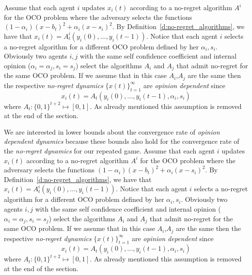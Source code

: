 Assume that each agent $i$ updates $x_i(t)$ according to a no-regret algorithm $A^i$
for the OCO problem where the adversary selects the functions
$(1-\alpha_i)(x-b_t)^2 + \alpha_i(x-s_i)^2$. By Definition~\ref{d:no-regret_algorithms},
we have that $x_i(t)= A^i_t(y_i(0),\ldots,y_i(t-1))$. Notice that
each agent $i$ selects a no-regret algorithm for a different OCO
problem defined by her $\alpha_i,s_i$. Obviously two agents $i,j$ with the same
self confidence coefficient and internal opinion ($\alpha_i=\alpha_j,s_i=s_j$)
select the algorithms $A_i$ and $A_j$ that admit no-regret for the same OCO problem.
If we assume that in this case $A_i$,$A_j$ are the same then
the respective \emph{no-regret dynamics} $\{x(t)\}_{t=1}^\infty$
are \emph{opinion dependent} since \[x_i(t) = A_t(y_i(0),\ldots,y_i(t-1),\alpha_i,s_i)\]
where $A_t:\{0,1\}^{t+2} \mapsto [0,1]$. As already mentioned this assumption is removed
at the end of the section.



We are interested in lower bounds about the convergence rate of
\emph{opinion dependent dynamics} because these bounds also hold
for the convergence rate of the \emph{no-regret dynamics} for our repeated game.
Assume that each agent $i$ updates $x_i(t)$ according to a no-regret algorithm $A^i$
for the OCO problem where the adversary selects the functions
$(1-\alpha_i)(x-b_t)^2 + \alpha_i(x-s_i)^2$. By Definition~\ref{d:no-regret_algorithms},
we have that $x_i(t)= A^i_t(y_i(0),\ldots,y_i(t-1))$. Notice that
each agent $i$ selects a no-regret algorithm for a different OCO
problem defined by her $\alpha_i,s_i$. Obviously two agents $i,j$ with the same
self confidence coefficient and internal opinion ($\alpha_i=\alpha_j,s_i=s_j$)
select the algorithms $A_i$ and $A_j$ that admit no-regret for the same OCO problem.
If we assume that in this case $A_i$,$A_j$ are the same then
the respective \emph{no-regret dynamics} $\{x(t)\}_{t=1}^\infty$
are \emph{opinion dependent} since \[x_i(t) = A_t(y_i(0),\ldots,y_i(t-1),\alpha_i,s_i)\]
where $A_t:\{0,1\}^{t+2} \mapsto [0,1]$. As already mentioned this assumption is removed
at the end of the section.

